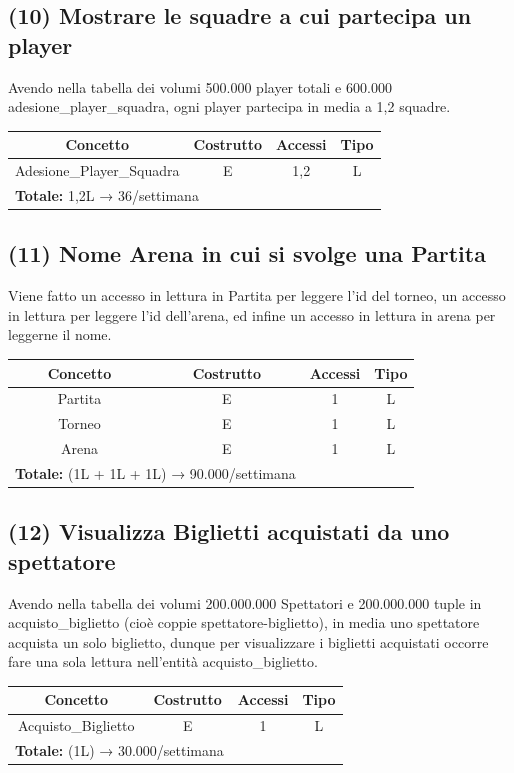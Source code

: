 \documentclass[a4paper,12pt]{report}
\begin{document}
\subsection*{(10) Mostrare le squadre a cui partecipa un player}
Avendo nella tabella dei volumi 500.000 player totali e 600.000 adesione\_player\_squadra, ogni player partecipa in media a 1,2 squadre.
\begin{center}
	\begin{tabular}{|c|c|c|c|}
		\hline\rowcolor{pink}
		Concetto & Costrutto & Accessi & Tipo\\
		\hline\hline		
		Adesione\_Player\_Squadra & E & 1,2 & L\\
		\hline
		\hline
		\multicolumn{2}{l}{%
			\textbf{Totale:} 1,2L → 36/settimana} \\
		\hline
	\end{tabular}
\end{center}
\subsection*{(11) Nome Arena in cui si svolge una Partita}
Viene fatto un accesso in lettura in Partita per leggere l'id del torneo, un accesso in lettura per leggere l'id dell'arena, ed infine un accesso in lettura in arena per leggerne il nome.
\begin{center}
	\begin{tabular}{|c|c|c|c|}
		\hline\rowcolor{pink}
		Concetto & Costrutto & Accessi & Tipo\\
		\hline\hline		
		Partita & E & 1 & L\\
		\hline
		Torneo & E & 1 & L\\
		\hline
		Arena & E & 1 & L\\
		\hline
		\multicolumn{2}{l}{%
			\textbf{Totale:} (1L + 1L + 1L) → 90.000/settimana} \\
		\hline
	\end{tabular}
\end{center}
\subsection*{(12)  Visualizza Biglietti acquistati da uno spettatore}
Avendo nella tabella dei volumi 200.000.000 Spettatori e 200.000.000 tuple in acquisto\_biglietto (cioè coppie spettatore-biglietto), in media uno spettatore acquista un solo biglietto, dunque per visualizzare i biglietti acquistati occorre fare una sola lettura nell'entità acquisto\_biglietto.
\begin{center}
	\begin{tabular}{|c|c|c|c|}
		\hline\rowcolor{pink}
		Concetto & Costrutto & Accessi & Tipo\\
		\hline\hline		
		Acquisto\_Biglietto & E & 1 & L\\
		\hline
		\multicolumn{2}{l}{%
			\textbf{Totale:} (1L) → 30.000/settimana} \\
		\hline
	\end{tabular}
\end{center}
\end{document}
